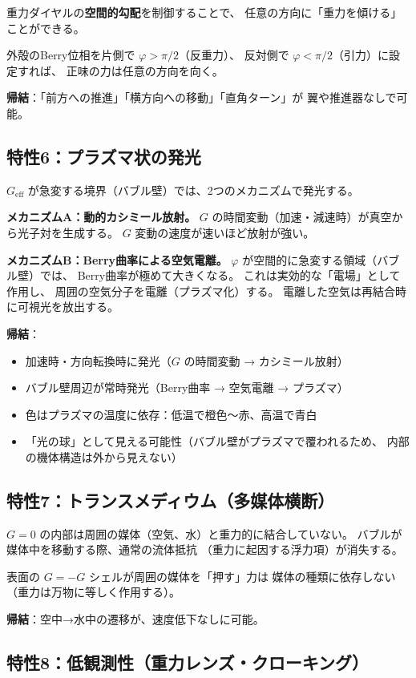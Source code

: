 \documentclass[11pt,a4paper]{article}
\begin{document}
重力ダイヤルの\textbf{空間的勾配}を制御することで、
任意の方向に「重力を傾ける」ことができる。

外殻のBerry位相を片側で $\varphi > \pi/2$（反重力）、
反対側で $\varphi < \pi/2$（引力）に設定すれば、
正味の力は任意の方向を向く。

\textbf{帰結}：「前方への推進」「横方向への移動」「直角ターン」が
翼や推進器なしで可能。

\subsection{特性6：プラズマ状の発光}

$G_{\mathrm{eff}}$ が急変する境界（バブル壁）では、2つのメカニズムで発光する。

\textbf{メカニズムA：動的カシミール放射。}
$G$ の時間変動（加速・減速時）が真空から光子対を生成する。
$G$ 変動の速度が速いほど放射が強い。

\textbf{メカニズムB：Berry曲率による空気電離。}
$\varphi$ が空間的に急変する領域（バブル壁）では、
Berry曲率が極めて大きくなる。
これは実効的な「電場」として作用し、
周囲の空気分子を電離（プラズマ化）する。
電離した空気は再結合時に可視光を放出する。

\textbf{帰結}：
\begin{itemize}
\item 加速時・方向転換時に発光（$G$ の時間変動 → カシミール放射）
\item バブル壁周辺が常時発光（Berry曲率 → 空気電離 → プラズマ）
\item 色はプラズマの温度に依存：低温で橙色〜赤、高温で青白
\item 「光の球」として見える可能性（バブル壁がプラズマで覆われるため、
  内部の機体構造は外から見えない）
\end{itemize}

\subsection{特性7：トランスメディウム（多媒体横断）}

$G = 0$ の内部は周囲の媒体（空気、水）と重力的に結合していない。
バブルが媒体中を移動する際、通常の流体抵抗
（重力に起因する浮力項）が消失する。

表面の $G = -G$ シェルが周囲の媒体を「押す」力は
媒体の種類に依存しない（重力は万物に等しく作用する）。

\textbf{帰結}：空中→水中の遷移が、速度低下なしに可能。

\subsection{特性8：低観測性（重力レンズ・クローキング）}
\end{document}
